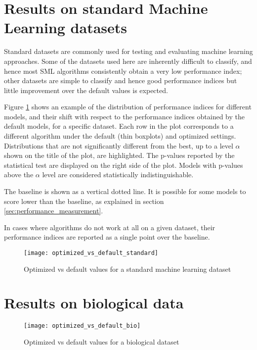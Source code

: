 \section{Results on standard Machine Learning datasets}

Standard datasets are commonly used for testing and evaluating machine learning approaches. Some of
the datasets used here are inherently difficult to classify, and hence most SML algorithms
consistently obtain a very low performance index; other datasets are simple to classify and hence
good performance indices but little improvement over the default values is expected.

Figure \ref{img:optvsdefstandard} shows an example of the distribution of performance indices for
different models, and their shift with respect to the performance indices obtained by the default
models, for a specific dataset. Each row in the plot corresponds to a different algorithm under the
default (thin boxplots) and optimized settings. Distributions that are not significantly different
from the best, up to a level $\alpha$ shown on the title of the plot, are highlighted. The p-values
reported by the statistical test are displayed on the right side of the plot. Models with p-values
above the $\alpha$ level are considered statistically indistinguishable.

The baseline is shown as a vertical dotted line. It is possible for some models to score lower than the
baseline, as explained in section \ref{sec:performance_measurement}.

In cases where algorithms do not work at all on a given dataset, their performance indices are
reported as a single point over the baseline.

\begin{figure}[h!]
	\centering
	\texttt{[image: optimized\_vs\_default\_standard]}
	\caption{Optimized vs default values for a standard machine learning dataset}
	\label{img:optvsdefstandard}
\end{figure}


\section{Results on biological data}

\begin{figure}[h!]
	\centering
	\texttt{[image: optimized\_vs\_default\_bio]}
	\caption{Optimized vs default values for a biological dataset}
	\label{img:optvsdefbio}
\end{figure}

